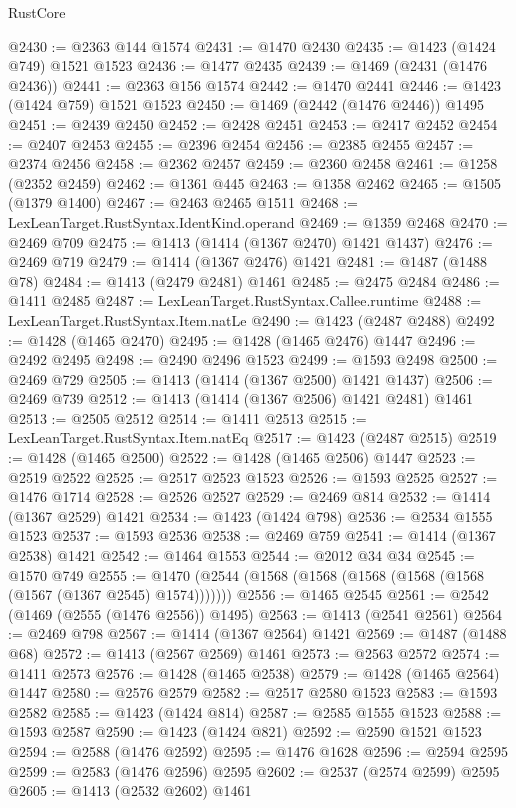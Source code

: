 \begin{lexlean}{RustCore}
\begin{coremodule}
@2430 := @2363 @144 @1574
@2431 := @1470 @2430
@2435 := @1423 (@1424 @749) @1521 @1523
@2436 := @1477 @2435
@2439 := @1469 (@2431 (@1476 @2436))
@2441 := @2363 @156 @1574
@2442 := @1470 @2441
@2446 := @1423 (@1424 @759) @1521 @1523
@2450 := @1469 (@2442 (@1476 @2446)) @1495
@2451 := @2439 @2450
@2452 := @2428 @2451
@2453 := @2417 @2452
@2454 := @2407 @2453
@2455 := @2396 @2454
@2456 := @2385 @2455
@2457 := @2374 @2456
@2458 := @2362 @2457
@2459 := @2360 @2458
@2461 := @1258 (@2352 @2459)
@2462 := @1361 @445
@2463 := @1358 @2462
@2465 := @1505 (@1379 @1400)
@2467 := @2463 @2465 @1511
@2468 := LexLeanTarget.RustSyntax.IdentKind.operand
@2469 := @1359 @2468
@2470 := @2469 @709
@2475 := @1413 (@1414 (@1367 @2470) @1421 @1437)
@2476 := @2469 @719
@2479 := @1414 (@1367 @2476) @1421
@2481 := @1487 (@1488 @78)
@2484 := @1413 (@2479 @2481) @1461
@2485 := @2475 @2484
@2486 := @1411 @2485
@2487 := LexLeanTarget.RustSyntax.Callee.runtime
@2488 := LexLeanTarget.RustSyntax.Item.natLe
@2490 := @1423 (@2487 @2488)
@2492 := @1428 (@1465 @2470)
@2495 := @1428 (@1465 @2476) @1447
@2496 := @2492 @2495
@2498 := @2490 @2496 @1523
@2499 := @1593 @2498
@2500 := @2469 @729
@2505 := @1413 (@1414 (@1367 @2500) @1421 @1437)
@2506 := @2469 @739
@2512 := @1413 (@1414 (@1367 @2506) @1421 @2481) @1461
@2513 := @2505 @2512
@2514 := @1411 @2513
@2515 := LexLeanTarget.RustSyntax.Item.natEq
@2517 := @1423 (@2487 @2515)
@2519 := @1428 (@1465 @2500)
@2522 := @1428 (@1465 @2506) @1447
@2523 := @2519 @2522
@2525 := @2517 @2523 @1523
@2526 := @1593 @2525
@2527 := @1476 @1714
@2528 := @2526 @2527
@2529 := @2469 @814
@2532 := @1414 (@1367 @2529) @1421
@2534 := @1423 (@1424 @798)
@2536 := @2534 @1555 @1523
@2537 := @1593 @2536
@2538 := @2469 @759
@2541 := @1414 (@1367 @2538) @1421
@2542 := @1464 @1553
@2544 := @2012 @34 @34
@2545 := @1570 @749
@2555 := @1470 (@2544 (@1568 (@1568 (@1568 (@1568 (@1568 (@1567 (@1367 @2545) @1574)))))))
@2556 := @1465 @2545
@2561 := @2542 (@1469 (@2555 (@1476 @2556)) @1495)
@2563 := @1413 (@2541 @2561)
@2564 := @2469 @798
@2567 := @1414 (@1367 @2564) @1421
@2569 := @1487 (@1488 @68)
@2572 := @1413 (@2567 @2569) @1461
@2573 := @2563 @2572
@2574 := @1411 @2573
@2576 := @1428 (@1465 @2538)
@2579 := @1428 (@1465 @2564) @1447
@2580 := @2576 @2579
@2582 := @2517 @2580 @1523
@2583 := @1593 @2582
@2585 := @1423 (@1424 @814)
@2587 := @2585 @1555 @1523
@2588 := @1593 @2587
@2590 := @1423 (@1424 @821)
@2592 := @2590 @1521 @1523
@2594 := @2588 (@1476 @2592)
@2595 := @1476 @1628
@2596 := @2594 @2595
@2599 := @2583 (@1476 @2596) @2595
@2602 := @2537 (@2574 @2599) @2595
@2605 := @1413 (@2532 @2602) @1461

\end{coremodule}
\end{lexlean}
